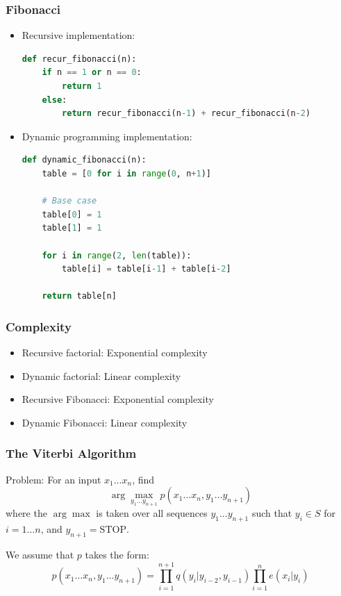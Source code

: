 \documentclass[handout]{beamer}
\begin{document}
\begin{frame}[fragile]
  \frametitle{Fibonacci}

  \begin{itemize}
    \item Recursive implementation:

    \begin{lstlisting}[language=Python]
def recur_fibonacci(n):
    if n == 1 or n == 0:
        return 1
    else:
        return recur_fibonacci(n-1) + recur_fibonacci(n-2)
    \end{lstlisting}

    \item Dynamic programming implementation:

    \begin{lstlisting}[language=Python]
def dynamic_fibonacci(n):
    table = [0 for i in range(0, n+1)]

    # Base case
    table[0] = 1
    table[1] = 1

    for i in range(2, len(table)):
        table[i] = table[i-1] + table[i-2]

    return table[n]
    \end{lstlisting}

  \end{itemize}

\end{frame}

\begin{frame}
  \frametitle{Complexity}

  \begin{itemize}
    \item Recursive factorial: Exponential complexity
    \item Dynamic factorial: Linear complexity
    \item Recursive Fibonacci: Exponential complexity
    \item Dynamic Fibonacci: Linear complexity
  \end{itemize}

\end{frame}




\begin{frame}
  \frametitle{The Viterbi Algorithm}
  Problem: For an input $x_1 \ldots x_n$, find
  \[
    \arg \max_{y_1 \ldots y_{n+1}} p(x_1 \ldots x_n, y_1 \ldots y_{n+1})
  \]
  where the $\arg \max$ is taken over all sequences $y_1 \ldots y_{n+1}$ such that $y_i \in S$ for $i = 1 \ldots n$, and $y_{n+1} = \text{STOP}$.

  We assume that $p$ takes the form:
  \[
    p(x_1 \ldots x_n, y_1 \ldots y_{n+1}) = \prod_{i=1}^{n+1} q(y_i|y_{i-2}, y_{i-1}) \prod_{i=1}^{n} e(x_i|y_i)
  \]
\end{frame}
\end{document}
